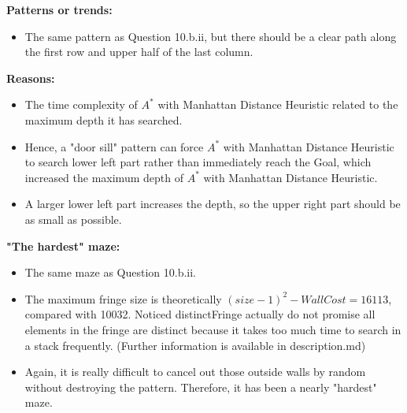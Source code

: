 \documentclass[letter]{article}
\begin{document}
\begin{enumerate}[resume]
\begin{enumerate}
\begin{enumerate}
				\textbf{Patterns or trends:} 
				\begin{itemize}
					\item {The same pattern as Question 10.b.ii, but there should be a clear path along the first row and upper half of the last column.}
				\end{itemize}
				
				\textbf{Reasons:} 
				\begin{itemize}
					\item {The time complexity of $ A^* $ with Manhattan Distance Heuristic related to the maximum depth it has searched.}
					\item {Hence, a "door sill" pattern can force $ A^* $ with Manhattan Distance Heuristic to search lower left part rather than immediately reach the Goal, which increased the maximum depth of $ A^* $ with Manhattan Distance Heuristic.}
					\item {A larger lower left part increases the depth, so the upper right part should be as small as possible.}
				\end{itemize}
				
				\textbf{"The hardest" maze:} 
				\begin{itemize}
					\item {The same maze as Question 10.b.ii.}
					\item {The maximum fringe size is theoretically $(size-1)^2-WallCost = 16113$, compared with 10032. Noticed distinctFringe actually do not promise all elements in the fringe are distinct because it takes too much time to search in a stack frequently. (Further information is available in description.md)}
					\item {Again, it is really difficult to cancel out those outside walls by random without destroying the pattern. Therefore, it has been a nearly "hardest" maze.}
				\end{itemize}
			\end{enumerate}
		\end{enumerate}
	\end{enumerate}
\end{document}
